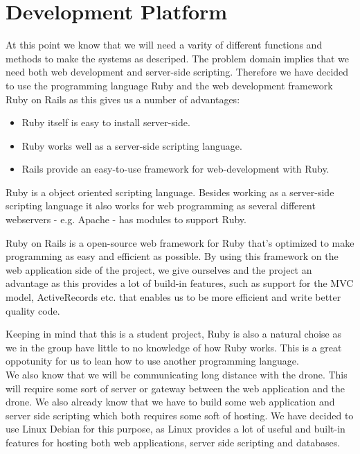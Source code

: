 \section{Development Platform}
At this point we know that we will need a varity of different functions and methods to make the systems as descriped.
The problem domain implies that we need both web development and server-side scripting. 
Therefore we have decided to use the programming language Ruby and the web development framework Ruby on Rails as this gives us a number of advantages:

\begin{itemize}
	\item Ruby itself is easy to install server-side.
	\item Ruby works well as a server-side scripting language.
	\item Rails provide an easy-to-use framework for web-development with Ruby.
\end{itemize}

Ruby is a object oriented scripting language.
Besides working as a server-side scripting language it also works for web programming as several different webservers - e.g. Apache - has modules to support Ruby. 

Ruby on Rails is a open-source web framework for Ruby that's optimized to make programming as easy and efficient as possible. 
By using this framework on the web application side of the project, we give ourselves and the project an advantage as this provides a lot of build-in features, such as support for the MVC model, ActiveRecords etc. that enables us to be more efficient and write better quality code.

Keeping in mind that this is a student project, Ruby is also a natural choise as we in the group have little to no knowledge of how Ruby works. 
This is a great oppotunity for us to lean how to use another programming language. \\

We also know that we will be communicating long distance with the drone. 
This will require some sort of server or gateway between the web application and the drone.
We also already know that we have to build some web application and server side scripting which both requires some soft of hosting.
We have decided to use Linux Debian for this purpose, as Linux provides a lot of useful and built-in features for hosting both web applications, server side scripting and databases. 
